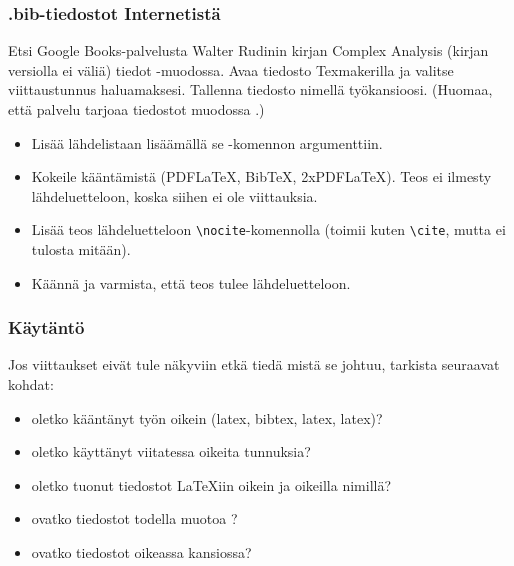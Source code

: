 \begin{fframe}
    \frametitle{.bib-tiedostot Internetistä}
    \begin{harj}
        Etsi Google Books-palvelusta Walter Rudinin kirjan Complex Analysis (kirjan versiolla ei väliä) tiedot \BibTeX -muodossa. Avaa tiedosto Texmakerilla ja valitse viittaustunnus haluamaksesi. Tallenna tiedosto nimellä  työkansioosi. (Huomaa, että palvelu tarjoaa tiedostot muodossa .)
    \end{harj}
    \begin{harj}
        \begin{itemize}
            \item Lisää  lähdelistaan lisäämällä se \lstinline---komennon argumenttiin.
            \item Kokeile kääntämistä (PDFLaTeX, BibTeX, 2xPDFLaTeX). Teos ei ilmesty lähdeluetteloon, koska siihen ei ole viittauksia.
            \item Lisää teos lähdeluetteloon \lstinline-\nocite--komennolla (toimii kuten \lstinline-\cite-, mutta ei tulosta mitään).
            \item Käännä ja varmista, että teos tulee lähdeluetteloon.
        \end{itemize}
    \end{harj}
\end{fframe}

\begin{fframe}
    \frametitle{Käytäntö}
    Jos viittaukset eivät tule näkyviin etkä tiedä mistä se johtuu, tarkista seuraavat kohdat:
    \begin{itemize}
        \item oletko kääntänyt työn oikein (latex, bibtex, latex, latex)?
        \item oletko käyttänyt viitatessa oikeita tunnuksia?
        \item oletko tuonut tiedostot \LaTeX iin oikein ja oikeilla nimillä?
        \item ovatko tiedostot todella muotoa ?
        \item ovatko tiedostot oikeassa kansiossa?
    \end{itemize}
\end{fframe}

